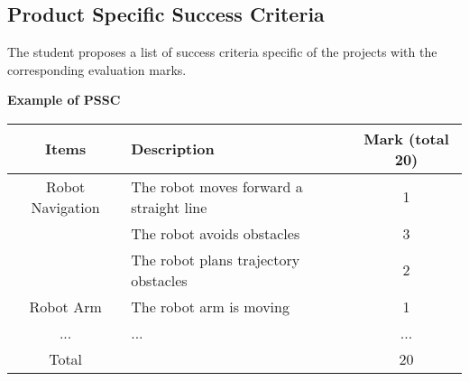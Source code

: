 \subsection*{Product Specific Success Criteria}

The student proposes a list of success criteria specific of the projects with the corresponding evaluation marks.

\textbf{Example of PSSC}
\begin{table}[h!]
    \begin{tabular}{|c|l|c|}
      \hline
      Items & Description & Mark (total 20) \\
      \hline
      Robot Navigation & The robot moves forward a straight line & 1 \\
      \cline{2-3} & The robot avoids obstacles  & 3 \\
      \cline{2-3} & The robot plans trajectory obstacles  & 2 \\
      \hline 
      Robot Arm & The robot arm is moving & 1 \\
      \hline 
      ... & ... & ... \\
      \hline 
      Total &  & 20 \\
      \hline
    \end{tabular}
\end{table}


\pagebreak